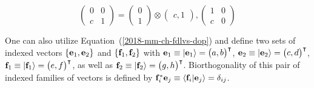 {$$
\begin{pmatrix}
0&0 \\
c&1
\end{pmatrix}
=
\begin{pmatrix}
0 \\
1
\end{pmatrix}
\otimes
\begin{pmatrix}
c,1
\end{pmatrix},
\begin{pmatrix}
1&0 \\
c&0
\end{pmatrix}
$$

One can also utilize Equation~(\ref{2018-mm-ch-fdlvs-dop}) and
define two sets of indexed vectors
$\{ {\bf e}_1 , {\bf e}_2 \}$ and
$\{ {\bf f}_1 , {\bf f}_2 \}$
with
$ {\bf e}_1 \equiv \vert {\bf e}_1\rangle =\begin{pmatrix} a,b\end{pmatrix}^\intercal$,
$ {\bf e}_2 \equiv \vert {\bf e}_2\rangle =\begin{pmatrix} c,d\end{pmatrix}^\intercal$,
$ {\bf f}_1 \equiv \vert {\bf f}_1\rangle =\begin{pmatrix} e,f\end{pmatrix}^\intercal$, as well as
$ {\bf f}_2 \equiv \vert {\bf f}_2\rangle =\begin{pmatrix} g,h\end{pmatrix}^\intercal$.
Biorthogonality
of this pair of indexed families of vectors is defined by
${\bf f}^\ast_i {\bf e}_j\equiv \langle {\bf f}_i \vert {\bf e}_j\rangle  =\delta_{ij}$.



%
%
%
%
%
%







}
